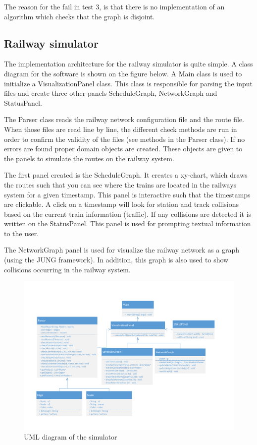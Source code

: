 \documentclass[10pt,a4paper]{article}
\begin{document}
The reason for the fail in test 3, is that there is no implementation of an algorithm which checks that the graph is disjoint.

\subsection{Railway simulator}
The implementation architecture for the railway simulator is quite simple. A class diagram for the software is shown on the figure below.
A Main class is used to initialize a VisualizationPanel class. This class is responsible for parsing the input files and create three other panels ScheduleGraph, NetworkGraph and StatusPanel.
 
The Parser class reads the railway network configuration file and the route file. When those files are read line by line, the different check methods are run in order to confirm the validity of the files (see methods in the Parser class). If no errors are found proper domain objects are created. These objects are given to the panels to simulate the routes on the railway system.
 
The first panel created is the ScheduleGraph. It creates a xy-chart, which draws the routes such that you can see where the trains are located in the railways system for a given timestamp.
This panel is interactive such that the timestamps are clickable. A click on a timestamp will look for station and track collisions based on the current train information (traffic).
If any collisions are detected it is written on the StatusPanel. This panel is used for prompting textual information to the user. 
 
The NetworkGraph panel is used for visualize the railway network as a graph (using the JUNG framework).
In addition, this graph is also used to show collisions occurring in the railway system.  

\begin{figure}[h]
\centering
\includegraphics[scale=0.5]{fig/uml.pdf}
 \caption{UML diagram of the simulator}
 \label{fig:uml_simulator}
\end{figure}
\end{document}
